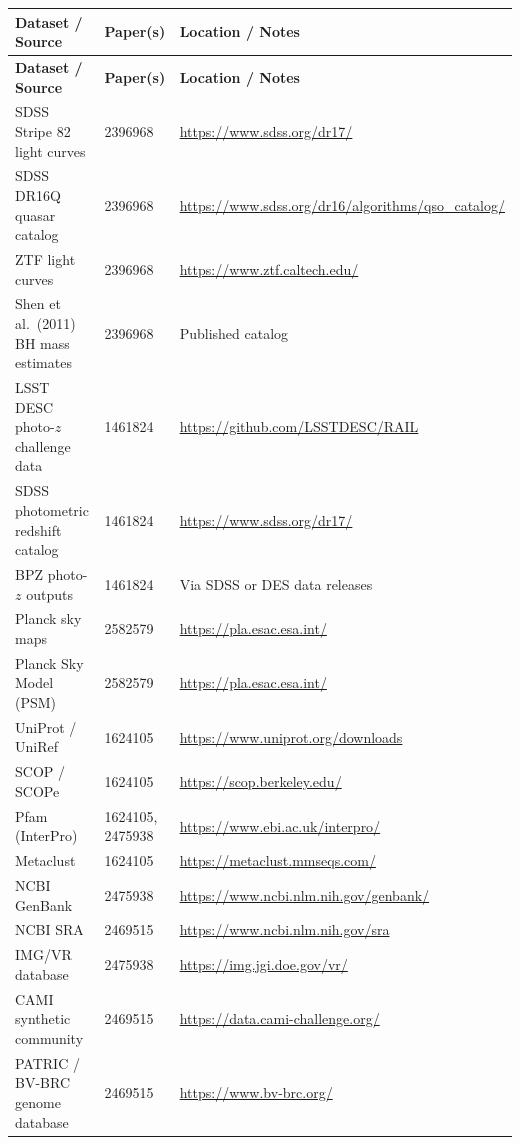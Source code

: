 \documentclass[11pt,a4paper]{article}
\begin{document}
\begin{longtable}{p{4.5cm} p{3cm} p{6.5cm}}
\toprule
\textbf{Dataset / Source} & \textbf{Paper(s)} & \textbf{Location / Notes} \\
\midrule
\endfirsthead
\toprule
\textbf{Dataset / Source} & \textbf{Paper(s)} & \textbf{Location / Notes} \\
\midrule
\endhead

SDSS Stripe 82 light curves & 2396968 & \url{https://www.sdss.org/dr17/} \\
\midrule
SDSS DR16Q quasar catalog & 2396968 & \url{https://www.sdss.org/dr16/algorithms/qso_catalog/} \\
\midrule
ZTF light curves & 2396968 & \url{https://www.ztf.caltech.edu/} \\
\midrule
Shen et al.\ (2011) BH mass estimates & 2396968 & Published catalog \\
\midrule
LSST DESC photo-$z$ challenge data & 1461824 & \url{https://github.com/LSSTDESC/RAIL} \\
\midrule
SDSS photometric redshift catalog & 1461824 & \url{https://www.sdss.org/dr17/} \\
\midrule
BPZ photo-$z$ outputs & 1461824 & Via SDSS or DES data releases \\
\midrule
Planck sky maps & 2582579 & \url{https://pla.esac.esa.int/} \\
\midrule
Planck Sky Model (PSM) & 2582579 & \url{https://pla.esac.esa.int/} \\
\midrule

UniProt / UniRef & 1624105 & \url{https://www.uniprot.org/downloads} \\
\midrule
SCOP / SCOPe & 1624105 & \url{https://scop.berkeley.edu/} \\
\midrule
Pfam (InterPro) & 1624105, 2475938 & \url{https://www.ebi.ac.uk/interpro/} \\
\midrule
Metaclust & 1624105 & \url{https://metaclust.mmseqs.com/} \\
\midrule
NCBI GenBank & 2475938 & \url{https://www.ncbi.nlm.nih.gov/genbank/} \\
\midrule
NCBI SRA & 2469515 & \url{https://www.ncbi.nlm.nih.gov/sra} \\
\midrule
IMG/VR database & 2475938 & \url{https://img.jgi.doe.gov/vr/} \\
\midrule
CAMI synthetic community & 2469515 & \url{https://data.cami-challenge.org/} \\
\midrule
PATRIC / BV-BRC genome database & 2469515 & \url{https://www.bv-brc.org/} \\
\midrule


\end{longtable}
\end{document}
